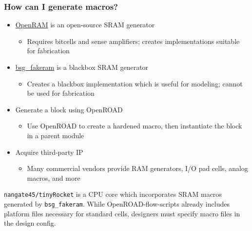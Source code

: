 \documentclass[a4paper,12pt,twoside]{article}
\begin{document}
\subsubsection{How can I generate macros?}
\begin{itemize}
    \item \href{https://github.com/VLSIDA/OpenRAM}{OpenRAM} is an open-source SRAM generator
    \begin{itemize}
        \item Requires bitcells and sense amplifiers; creates implementations suitable for fabrication
    \end{itemize}
    \item \href{https://github.com/bespoke-silicon-group/bsg_fakeram}{bsg\_fakeram} is a blackbox SRAM generator
    \begin{itemize}
        \item Creates a blackbox implementation which is useful for modeling; cannot be used for fabrication
    \end{itemize}
    \item Generate a block using OpenROAD
    \begin{itemize}
        \item Use OpenROAD to create a hardened macro, then instantiate the block in a parent module
    \end{itemize}
    \item Acquire third-party IP
    \begin{itemize}
        \item Many commercial vendors provide RAM generators, I/O pad cells, analog macros, and more
    \end{itemize}
\end{itemize}
\texttt{nangate45/tinyRocket} is a CPU core which incorporates SRAM macros generated by \texttt{bsg\_fakeram}. While OpenROAD-flow-scripts already includes platform files necessary for standard cells, designers must specify macro files in the design config.
\end{document}
